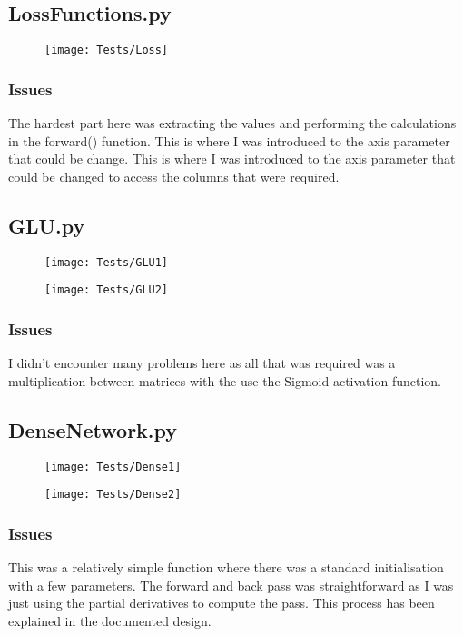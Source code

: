 \documentclass{article}
\begin{document}
\subsection{LossFunctions.py}

\begin{figure}[H]
    \centering
    \texttt{[image: Tests/Loss]}
\end{figure}

\subsubsection{Issues}
The hardest part here was extracting the values and performing the
calculations in the forward() function. This is where I was introduced to the axis
parameter that could be change. This is where I was introduced to the axis
parameter that could be changed to access the columns that were required.

\subsection{GLU.py}

\begin{figure}[H]
    \centering
    \texttt{[image: Tests/GLU1]}
\end{figure}


\begin{figure}[H]
    \centering
    \texttt{[image: Tests/GLU2]}
\end{figure}

\subsubsection{Issues}
I didn't encounter many problems here as all that was required was a multiplication
between matrices with the use the Sigmoid activation function.
\subsection{DenseNetwork.py}

\begin{figure}[H]
    \centering
    \texttt{[image: Tests/Dense1]}
\end{figure}

\begin{figure}[H]
    \centering
    \texttt{[image: Tests/Dense2]}
\end{figure}
\subsubsection{Issues}
This was a relatively simple function where there was a standard initialisation
with a few parameters. The forward and back pass was straightforward as I was
just using the partial derivatives to compute the pass. This process has been
explained in the documented design.
\end{document}
